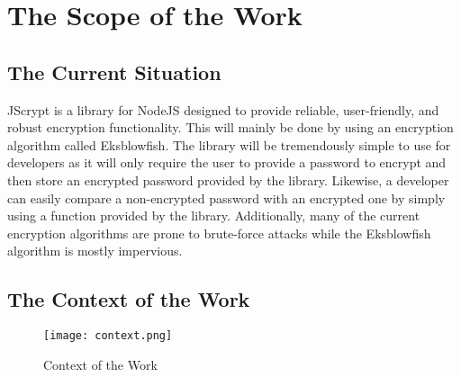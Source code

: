 \documentclass[12pt]{article}
\begin{document}
\section*{}
\section{The Scope of the Work}
\subsection{The Current Situation}
	 JScrypt is a library for NodeJS designed to provide reliable, user-friendly, and robust encryption functionality. This will mainly be done by using an encryption algorithm called Eksblowfish. The library will be tremendously simple to use for developers as it will only require the user to provide a password to encrypt and then store an encrypted password provided by the library. Likewise, a developer can easily compare a non-encrypted password with an encrypted one by simply using a function provided by the library. Additionally, many of the current encryption algorithms are prone to brute-force attacks while the Eksblowfish algorithm  is mostly impervious.


\subsection{The Context of the Work}

	\begin{figure}[H]
	\centerline{\texttt{[image: context.png]}}
	\caption{Context of the Work}
	\end{figure}
\end{document}
